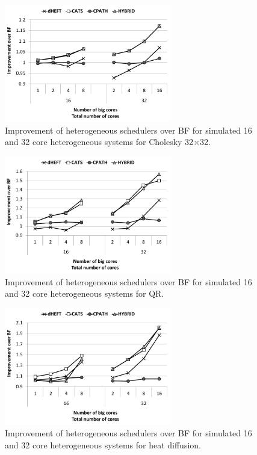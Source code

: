 \begin{figure}[!t]
	\centering
  		\includegraphics[width=0.65\textwidth]{images/cholesky_TS_tall.pdf}
		\caption{Improvement of heterogeneous schedulers over BF for simulated 16 and 32 core heterogeneous systems for Cholesky 32$\times$32.}
  		\label{cholesky_ts}
\end{figure}
\begin{figure}[h]
	\centering
	\includegraphics[width=0.65\textwidth]{images/QR_TS_tall.pdf}
	\caption{Improvement of heterogeneous schedulers over BF for simulated 16 and 32 core heterogeneous systems for QR.}
	\label{qr_ts}
	
\end{figure}
\begin{figure}
	\centering
  		\includegraphics[width=0.65\textwidth]{images/heat_TS_tall.pdf}
  		\caption{Improvement of heterogeneous schedulers over BF for simulated 16 and 32 core heterogeneous systems for heat diffusion.}
  		\label{heat_ts}
\end{figure}
